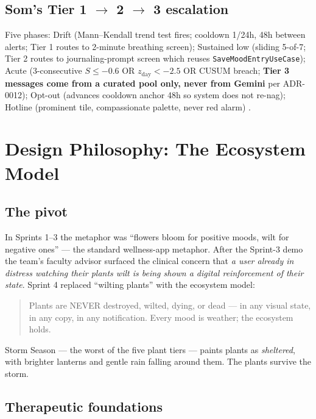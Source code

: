 \documentclass[11pt,a4paper]{article}
\begin{document}
\subsection{Som's Tier 1 $\rightarrow$ 2 $\rightarrow$ 3 escalation}

Five phases: Drift (Mann--Kendall trend test fires; cooldown 1/24h, 48h
between alerts; Tier 1 routes to 2-minute breathing screen); Sustained low
(sliding 5-of-7; Tier 2 routes to journaling-prompt screen which reuses
\texttt{SaveMoodEntryUseCase}); Acute (3-consecutive $S \leq -0.6$ OR
$z_{\text{day}} < -2.5$ OR CUSUM breach; \textbf{Tier 3 messages come
from a curated pool only, never from Gemini} per ADR-0012); Opt-out
(advances cooldown anchor 48h so system does not re-nag); Hotline
(prominent tile, compassionate palette, never red alarm)
\autocite{stanley2012safety,nahum2018jitai}.

\section{Design Philosophy: The Ecosystem Model}

\subsection{The pivot}

In Sprints 1--3 the metaphor was ``flowers bloom for positive moods, wilt
for negative ones'' --- the standard wellness-app metaphor. After the
Sprint-3 demo the team's faculty advisor surfaced the clinical concern
that \emph{a user already in distress watching their plants wilt is
being shown a digital reinforcement of their state}. Sprint 4 replaced
``wilting plants'' with the ecosystem model:

\begin{quote}
Plants are NEVER destroyed, wilted, dying, or dead --- in any visual state,
in any copy, in any notification. Every mood is weather; the ecosystem
holds.
\end{quote}

Storm Season --- the worst of the five plant tiers --- paints plants as
\emph{sheltered}, with brighter lanterns and gentle rain falling around
them. The plants survive the storm.

\subsection{Therapeutic foundations}
\end{document}
